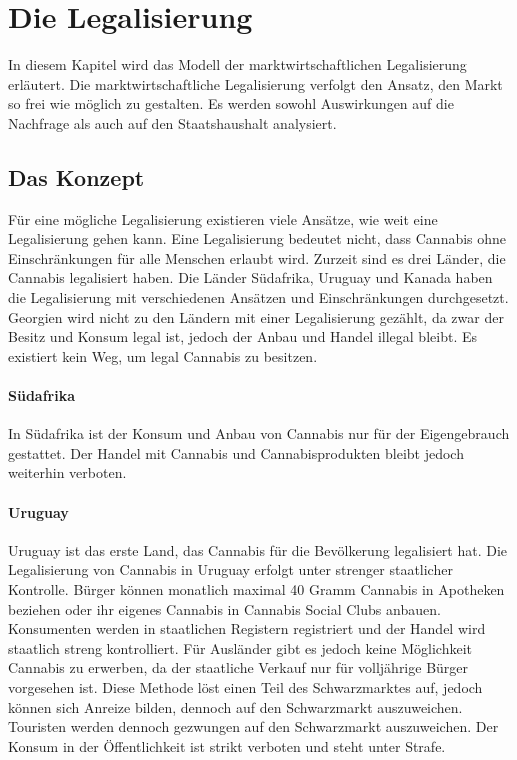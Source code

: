 \documentclass[../main.tex]{subfiles}
\begin{document}
	 \section{Die Legalisierung}
	 In diesem Kapitel wird das Modell der marktwirtschaftlichen Legalisierung erläutert. 
	 Die marktwirtschaftliche Legalisierung verfolgt den Ansatz, den Markt so frei wie möglich zu gestalten. 
	 Es werden sowohl Auswirkungen auf die Nachfrage als auch auf den Staatshaushalt analysiert. 
	
	 
	 \subsection{Das Konzept}
	 Für eine mögliche Legalisierung existieren viele Ansätze, wie weit eine Legalisierung gehen kann.
	 Eine Legalisierung bedeutet nicht, dass Cannabis ohne Einschränkungen für alle Menschen erlaubt wird.
	 Zurzeit sind es drei Länder, die Cannabis legalisiert haben.
	 Die Länder Südafrika, Uruguay und Kanada haben die Legalisierung mit verschiedenen Ansätzen und Einschränkungen durchgesetzt.
	 Georgien wird nicht zu den Ländern mit einer Legalisierung gezählt, da zwar der Besitz und Konsum legal ist, jedoch der Anbau und Handel illegal bleibt. 
	 Es existiert kein Weg, um legal Cannabis zu besitzen.
	 
	 \paragraph{Südafrika}
	 In Südafrika ist der Konsum und Anbau von Cannabis nur für der Eigengebrauch gestattet.
	 Der Handel mit Cannabis und Cannabisprodukten bleibt jedoch weiterhin verboten.
	 
	 
	 \paragraph{Uruguay}
	 Uruguay ist das erste Land, das Cannabis für die Bevölkerung legalisiert hat.
	 Die Legalisierung von Cannabis in Uruguay erfolgt unter strenger staatlicher Kontrolle. 
	 Bürger können monatlich maximal 40 Gramm Cannabis in Apotheken beziehen oder ihr eigenes Cannabis in Cannabis Social Clubs anbauen.
	 Konsumenten werden in staatlichen Registern registriert und der Handel wird staatlich streng kontrolliert.
	 Für Ausländer gibt es jedoch keine Möglichkeit Cannabis zu erwerben, da der staatliche Verkauf nur für volljährige Bürger vorgesehen ist.
	 Diese Methode löst einen Teil des Schwarzmarktes auf, jedoch können sich Anreize bilden, dennoch auf den Schwarzmarkt auszuweichen. 
	 Touristen werden dennoch gezwungen auf den Schwarzmarkt auszuweichen.
	 Der Konsum in der Öffentlichkeit ist strikt verboten und steht unter Strafe.
	 	 
\end{document}
